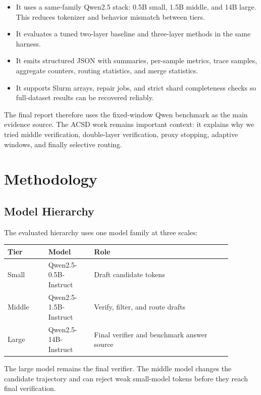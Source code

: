 \documentclass[11pt]{article}
\begin{document}
\begin{itemize}
  \item It uses a same-family Qwen2.5 stack: 0.5B small, 1.5B middle, and 14B large. This reduces tokenizer and behavior mismatch between tiers.
  \item It evaluates a tuned two-layer baseline and three-layer methods in the same harness.
  \item It emits structured JSON with summaries, per-sample metrics, trace samples, aggregate counters, routing statistics, and merge statistics.
  \item It supports Slurm arrays, repair jobs, and strict shard completeness checks so full-dataset results can be recovered reliably.
\end{itemize}

The final report therefore uses the fixed-window Qwen benchmark as the main evidence source. The ACSD work remains important context: it explains why we tried middle verification, double-layer verification, proxy stopping, adaptive windows, and finally selective routing.

\section{Methodology}

\subsection{Model Hierarchy}

The evaluated hierarchy uses one model family at three scales:

\begin{center}
\begin{tabular}{p{0.16\linewidth}p{0.18\linewidth}p{0.54\linewidth}}
\toprule
Tier & Model & Role \\
\midrule
Small & Qwen2.5-0.5B-Instruct & Draft candidate tokens \\
Middle & Qwen2.5-1.5B-Instruct & Verify, filter, and route drafts \\
Large & Qwen2.5-14B-Instruct & Final verifier and benchmark answer source \\
\bottomrule
\end{tabular}
\end{center}

The large model remains the final verifier. The middle model changes the candidate trajectory and can reject weak small-model tokens before they reach final verification.
\end{document}
